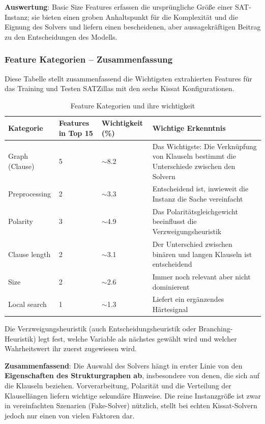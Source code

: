 \textbf{Auswertung}: Basic Size Features erfassen die ursprüngliche Größe einer SAT-Instanz; sie bieten 
einen groben Anhaltspunkt für die Komplexität und die Eignung des Solvers und liefern einen bescheidenen, 
aber aussagekräftigen Beitrag zu den Entscheidungen des Modells.

\subsubsection{Feature Kategorien – Zusammenfassung}

Diese Tabelle stellt zusammenfassend die Wichtigsten extrahierten Features für das Training und Testen 
SATZillas mit den sechs Kissat Konfigurationen.

\begin{table}[H]
    \centering
    \begin{tabular}{p{}p{}p{}p{}}
        \textbf{Kategorie} & \textbf{Features in Top 15} & \textbf{Wichtigkeit (\%)} & \textbf{Wichtige Erkenntnis} \\
        \toprule
        Graph (Clause) & 5 & $\sim$8.2 & Das Wichtigste: Die Verknüpfung von Klauseln bestimmt die Unterschiede zwischen den Solvern \\
        \midrule
        Preprocessing & 2 & $\sim$3.3 & Entscheidend ist, inwieweit die Instanz die Sache vereinfacht \\
        \midrule
        Polarity & 3 & $\sim$4.9 & Das Polaritätsgleichgewicht beeinflusst die Verzweigungsheuristik \\
        \midrule
        Clause length & 2 & $\sim$3.1 & Der Unterschied zwischen binären und langen Klauseln ist entscheidend \\
        \midrule
        Size & 2 & $\sim$2.6 & Immer noch relevant aber nicht dominierent \\
        \midrule
        Local search & 1 & $\sim$1.3 & Liefert ein ergänzendes Härtesignal \\
        \bottomrule
    \end{tabular}
    \caption{Feature Kategorien und ihre wichtigkeit}\label{tab:feature_Kategorien}
\end{table}

Die Verzweigungsheuristik (auch Entscheidungsheuristik oder Branching-Heuristik) legt fest, welche 
Variable als nächstes gewählt wird und welcher Wahrheitswert ihr zuerst zugewiesen wird.\cite{biere2021handbook}

\textbf{Zusammenfassend}: Die Auswahl des Solvers hängt in erster Linie von den \textbf{Eigenschaften des 
Strukturgraphen ab}, insbesondere von denen, die sich auf die Klauseln beziehen. Vorverarbeitung, 
Polarität und die Verteilung der Klausellängen liefern wichtige sekundäre Hinweise. Die reine 
Instanzgröße ist zwar in vereinfachten Szenarien (Fake-Solver) nützlich, stellt bei echten Kissat-Solvern 
jedoch nur einen von vielen Faktoren dar.

